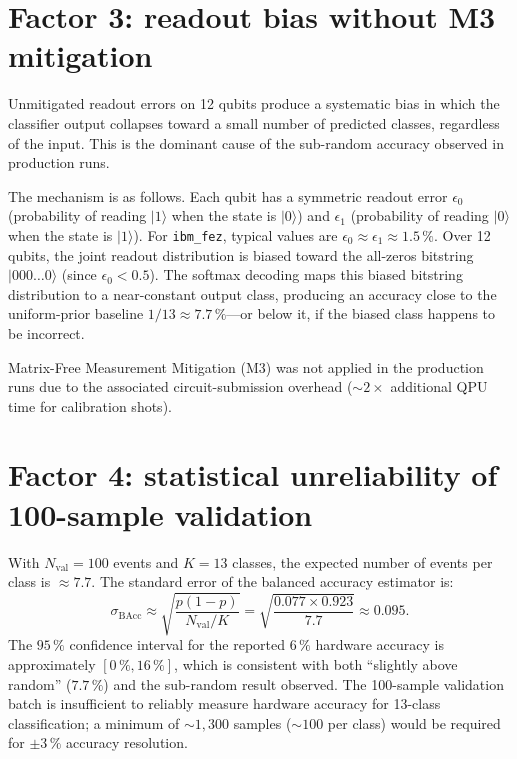 \documentclass[11pt,a4paper, english]{book}
\theoremstyle{plain}
\theoremstyle{definition}
\numberwithin{equation}{chapter}
\numberwithin{figure}{chapter}
\numberwithin{table}{chapter}
\begin{document}
\section{Factor 3: readout bias without M3 mitigation}
\label{app:gap-readout}

Unmitigated readout errors on 12 qubits produce a systematic bias in which 
the classifier output collapses toward a small number of predicted classes, 
regardless of the input.  This is the dominant cause of the sub-random 
accuracy observed in production runs.

The mechanism is as follows.  Each qubit has a symmetric readout error 
$\epsilon_0$ (probability of reading $|1\rangle$ when the state is 
$|0\rangle$) and $\epsilon_1$ (probability of reading $|0\rangle$ when 
the state is $|1\rangle$).  For \texttt{ibm\_fez}, typical values are 
$\epsilon_0 \approx \epsilon_1 \approx 1.5\,\%$.  Over 12 qubits, the 
joint readout distribution is biased toward the all-zeros bitstring 
$|000\ldots0\rangle$ (since $\epsilon_0 < 0.5$).  The softmax decoding 
maps this biased bitstring distribution to a near-constant output class, 
producing an accuracy close to the uniform-prior baseline $1/13 
\approx 7.7\,\%$---or below it, if the biased class happens to be 
incorrect.  

Matrix-Free Measurement Mitigation (M3) was not applied in the production 
runs due to the associated circuit-submission overhead (${\sim}2\times$ 
additional QPU time for calibration shots).

\section{Factor 4: statistical unreliability of 100-sample validation}
\label{app:gap-statistics}

With $N_\mathrm{val} = 100$ events and $K=13$ classes, the expected number 
of events per class is $\approx 7.7$.  The standard error of the balanced 
accuracy estimator is:
\begin{equation}
  \sigma_\mathrm{BAcc} \approx \sqrt{\frac{p(1-p)}{N_\mathrm{val}/K}}
  = \sqrt{\frac{0.077 \times 0.923}{7.7}} \approx 0.095.
\end{equation}
The $95\,\%$ confidence interval for the reported $6\,\%$ hardware accuracy 
is approximately $[0\,\%, 16\,\%]$, which is consistent with both 
``slightly above random'' ($7.7\,\%$) and the sub-random result observed.  
The 100-sample validation batch is insufficient to reliably measure 
hardware accuracy for 13-class classification; a minimum of $\sim\!1{,}300$ 
samples (${\sim}100$ per class) would be required for ${\pm}3\,\%$ 
accuracy resolution.
\end{document}
